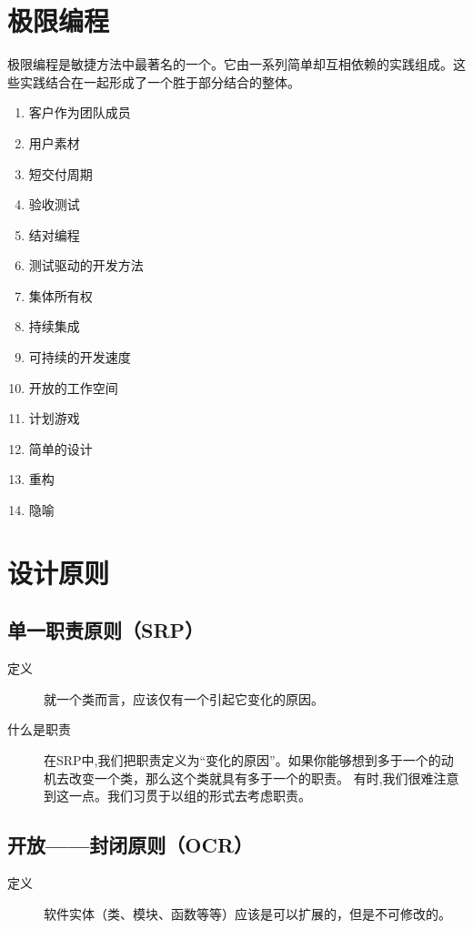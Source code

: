 \documentclass[11pt]{article}
\begin{document}
\section{极限编程}
\label{sec:org88069c2}
极限编程是敏捷方法中最著名的一个。它由一系列简单却互相依赖的实践组成。这些实践结合在一起形成了一个胜于部分结合的整体。

\begin{enumerate}
\item 客户作为团队成员
\item 用户素材
\item 短交付周期
\item 验收测试
\item 结对编程
\item 测试驱动的开发方法
\item 集体所有权
\item 持续集成
\item 可持续的开发速度
\item 开放的工作空间
\item 计划游戏
\item 简单的设计
\item 重构
\item 隐喻
\end{enumerate}

\section{设计原则}
\label{sec:org68e07e2}
\subsection{单一职责原则（SRP）}
\label{sec:orga7caf47}
\begin{description}
\item[{定义}] 就一个类而言，应该仅有一个引起它变化的原因。
\item[{什么是职责}] 在SRP中,我们把职责定义为“变化的原因”。如果你能够想到多于一个的动机去改变一个类，那么这个类就具有多于一个的职责。
有时,我们很难注意到这一点。我们习贯于以组的形式去考虑职责。
\end{description}
\subsection{开放——封闭原则（OCR）}
\label{sec:org839b037}
\begin{description}
\item[{定义}] 软件实体（类、模块、函数等等）应该是可以扩展的，但是不可修改的。
\end{description}
\end{document}
